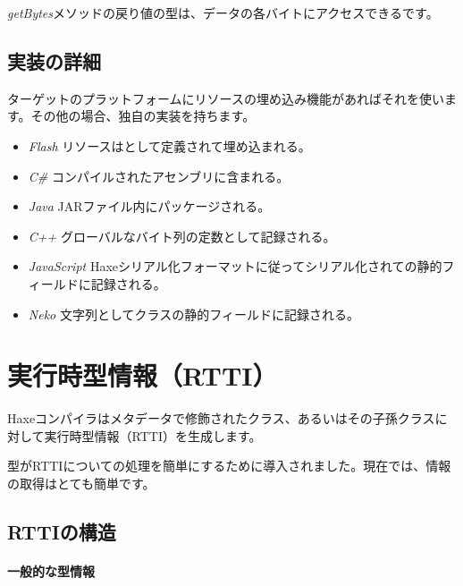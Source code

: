 
\emph{getBytes}メソッドの戻り値の型は、データの各バイトにアクセスできるです。

\subsection{実装の詳細}
\label{cr-resources-impl}

ターゲットのプラットフォームにリソースの埋め込み機能があればそれを使います。その他の場合、独自の実装を持ちます。

\begin{itemize}
\item \emph{Flash} リソースはとして定義されて埋め込まれる。
\item \emph{C\#} コンパイルされたアセンブリに含まれる。
\item \emph{Java} JARファイル内にパッケージされる。
\item \emph{C++} グローバルなバイト列の定数として記録される。
\item \emph{JavaScript} Haxeシリアル化フォーマットに従ってシリアル化されての静的フィールドに記録される。
\item \emph{Neko} 文字列としてクラスの静的フィールドに記録される。
\end{itemize}


\section{実行時型情報（RTTI）}
\label{cr-rtti}

Haxeコンパイラはメタデータで修飾されたクラス、あるいはその子孫クラスに対して実行時型情報（RTTI）を生成します。


型がRTTIについての処理を簡単にするために導入されました。現在では、情報の取得はとても簡単です。


\subsection{RTTIの構造}
\label{cr-rtti-structure}

\paragraph{一般的な型情報}

